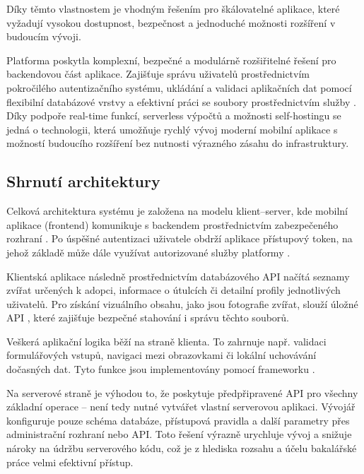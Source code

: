 \documentclass[czech, bp, kiv, he, iso690numb, pdf]{fasthesis}
\begin{document}
    Díky těmto vlastnostem je  vhodným řešením pro škálovatelné aplikace, které vyžadují vysokou dostupnost, bezpečnost a jednoduché možnosti rozšíření v budoucím vývoji.


    Platforma  poskytla komplexní, bezpečné a modulárně rozšiřitelné řešení pro backendovou část aplikace. Zajišťuje správu uživatelů prostřednictvím pokročilého autentizačního systému, ukládání a validaci aplikačních dat pomocí flexibilní databázové vrstvy a efektivní práci se soubory prostřednictvím služby . Díky podpoře real-time funkcí, serverless výpočtů a možnosti self-hostingu se jedná o technologii, která umožňuje rychlý vývoj moderní mobilní aplikace s možností budoucího rozšíření bez nutnosti výrazného zásahu do infrastruktury.



    \subsection{Shrnutí architektury}

    Celková architektura systému je založena na modelu klient--server, kde mobilní aplikace (frontend) komunikuje s backendem prostřednictvím zabezpečeného rozhraní . Po úspěšné autentizaci uživatele obdrží aplikace přístupový token, na jehož základě může dále využívat autorizované služby platformy .

    Klientská aplikace následně prostřednictvím databázového API načítá seznamy zvířat určených k adopci, informace o útulcích či detailní profily jednotlivých uživatelů. Pro získání vizuálního obsahu, jako jsou fotografie zvířat, slouží úložné API , které zajišťuje bezpečné stahování i správu těchto souborů.

    Veškerá aplikační logika běží na straně klienta. To zahrnuje např. validaci formulářových vstupů, navigaci mezi obrazovkami či lokální uchovávání dočasných dat. Tyto funkce jsou implementovány pomocí frameworku .

    Na serverové straně je výhodou  to, že poskytuje předpřipravené API pro všechny základní operace – není tedy nutné vytvářet vlastní serverovou aplikaci. Vývojář konfiguruje pouze schéma databáze, přístupová pravidla a další parametry přes administrační rozhraní nebo API. Toto řešení výrazně urychluje vývoj a snižuje nároky na údržbu serverového kódu, což je z hlediska rozsahu a účelu bakalářské práce velmi efektivní přístup.
\end{document}

